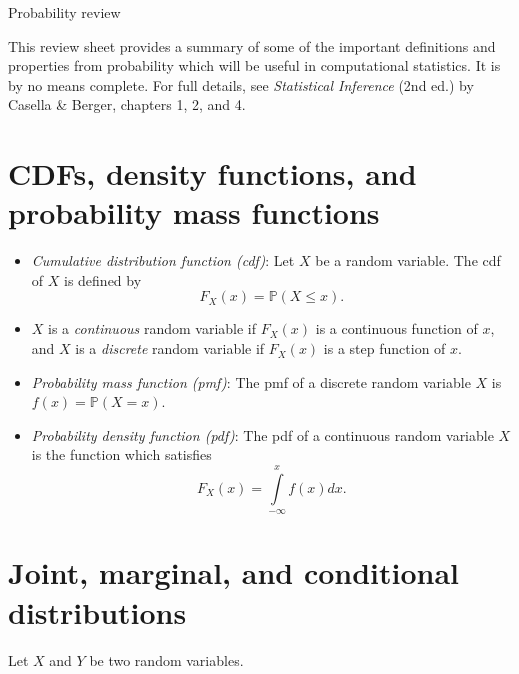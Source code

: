 \documentclass[11pt]{article}
\begin{document}
\begin{center}
\Large
Probability review\\
\normalsize
\vspace{5mm}
\end{center}

\noindent This review sheet provides a summary of some of the important definitions and properties from probability which will be useful in computational statistics. It is by no means complete. For full details, see \textit{Statistical Inference} (2nd ed.) by Casella \& Berger, chapters 1, 2, and 4.

\section*{CDFs, density functions, and probability mass functions}

\begin{itemize}
\item \textit{Cumulative distribution function (cdf)}: Let $X$ be a random variable. The cdf of $X$ is defined by 
$$F_X(x) = \mathbb{P}(X \leq x).$$

\item $X$ is a \textit{continuous} random variable if $F_X(x)$ is a continuous function of $x$, and $X$ is a \textit{discrete} random variable if $F_X(x)$ is a step function of $x$.

\item \textit{Probability mass function (pmf)}: The pmf of a discrete random variable $X$ is $f(x) = \mathbb{P}(X = x)$.

\item \textit{Probability density function (pdf)}: The pdf of a continuous random variable $X$ is the function which satisfies
$$F_X(x) = \int \limits_{-\infty}^x f(x) dx.$$
\end{itemize}

\section*{Joint, marginal, and conditional distributions}

Let $X$ and $Y$ be two random variables.
\end{document}
